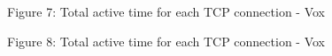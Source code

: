 \documentclass[12pt]{article}
\begin{document}
\hspace*{-3cm}
{
\begin{center}Figure 7: Total active time for each TCP connection - Vox\end{center}
}
\vspace*{-2cm}
\hspace*{-2cm}
{
\begin{center}Figure 8: Total active time for each TCP connection - Vox\end{center}
}
\end{document}

